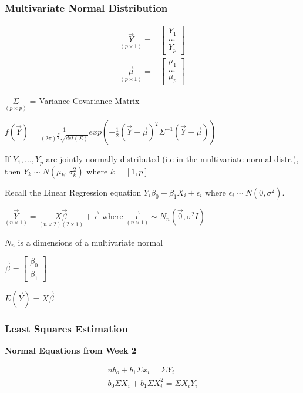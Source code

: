 \documentclass[11pt]{article}
\begin{document}
\subsubsection{Multivariate Normal Distribution}
\label{sec:org1e31d11}
\begin{equation}
\begin{split}
\underset{(p \times 1)}{\vec{Y}} = & \begin{bmatrix}
Y_1\\
...\\
Y_p
\end{bmatrix}\\
\underset{(p \times 1)}{\vec{\mu}} = & \begin{bmatrix}
\mu_1\\
...\\
\mu_p
\end{bmatrix}
\end{split}
\end{equation}


\(\underset{(p \times p)}{\Sigma}\) = Variance-Covariance Matrix

\(f(\vec{Y}) = \frac{1}{(2 \pi )^{\frac{P}{2}}
\sqrt{det(\Sigma)}}exp(-\frac{1}{2}(\vec{Y} - \vec{\mu})^T \Sigma^{-1}
(\vec{Y} - \vec{\mu}))\)

If \(Y_1, ..., Y_p\) are jointly normally distributed (i.e in the multivariate
normal distr.), then \(Y_k \sim N(\mu_k, \sigma^2_k)\) where \(k = [1, p]\)

Recall the Linear Regression equation \(Y_i \beta_0 + \beta_1 X_i + \epsilon_i\)
where \(\epsilon_i \sim N(0, \sigma^2)\).

\(\underset{(n \times 1)}{\vec{Y}} = \underset{(n \times 2)(2 \times 1)}{X
\vec{\beta}} + \vec{\epsilon}\) where \(\underset{(n \times 1)}{\vec{\epsilon}}
\sim N_n(\vec{0}, \sigma^2 I)\)

\(N_n\) is a dimensions of a multivariate normal

\(\vec{\beta} = \begin{bmatrix}
\beta_0\\
\beta_1
\end{bmatrix}\)

\(E(\vec{Y}) = X \vec{\beta}\)

\subsubsection{Least Squares Estimation}
\label{sec:orgf510c7f}
\textbf{Normal Equations from Week 2}

\begin{equation}
\begin{split}
n b_o + b_1 \Sigma x_i = \Sigma Y_i\\
b_0 \Sigma X_i + b_1 \Sigma X_i^2 = \Sigma X_i Y_i
\end{split}
\end{equation}
\end{document}
